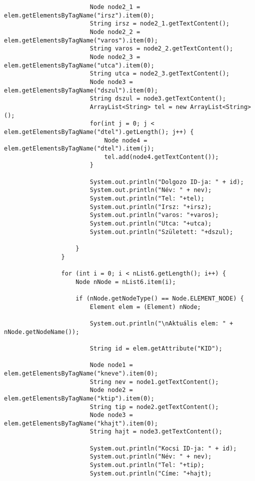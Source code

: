 \documentclass[14pt]{extarticle}
\begin{document}
\begin{normalsize}
\begin{verbatim}
		                Node node2_1 = elem.getElementsByTagName("irsz").item(0);
		                String irsz = node2_1.getTextContent();
		                Node node2_2 = elem.getElementsByTagName("varos").item(0);
		                String varos = node2_2.getTextContent();
		                Node node2_3 = elem.getElementsByTagName("utca").item(0);
		                String utca = node2_3.getTextContent();
		                Node node3 = elem.getElementsByTagName("dszul").item(0);
		                String dszul = node3.getTextContent();
		                ArrayList<String> tel = new ArrayList<String>();
		                for(int j = 0; j < elem.getElementsByTagName("dtel").getLength(); j++) {
		                	Node node4 = elem.getElementsByTagName("dtel").item(j);
		                	tel.add(node4.getTextContent());
		                }
		                
		                System.out.println("Dolgozo ID-ja: " + id);
		                System.out.println("Név: " + nev);
		                System.out.println("Tel: "+tel);
		                System.out.println("Irsz: "+irsz);
		                System.out.println("varos: "+varos);
		                System.out.println("Utca: "+utca);
		                System.out.println("Született: "+dszul);

		            }
		        }
		        
		        for (int i = 0; i < nList6.getLength(); i++) {
		            Node nNode = nList6.item(i);

		            if (nNode.getNodeType() == Node.ELEMENT_NODE) {
		                Element elem = (Element) nNode;

		                System.out.println("\nAktuális elem: " + nNode.getNodeName());

		                String id = elem.getAttribute("KID");

		                Node node1 = elem.getElementsByTagName("kneve").item(0);
		                String nev = node1.getTextContent();
		                Node node2 = elem.getElementsByTagName("ktip").item(0);
		                String tip = node2.getTextContent();
		                Node node3 = elem.getElementsByTagName("khajt").item(0);
		                String hajt = node3.getTextContent();		             
		                
		                System.out.println("Kocsi ID-ja: " + id);
		                System.out.println("Név: " + nev);
		                System.out.println("Tel: "+tip);
		                System.out.println("Címe: "+hajt);


\end{verbatim}
\end{normalsize}
\end{document}
